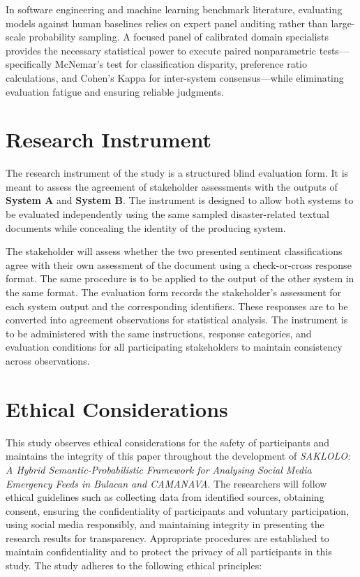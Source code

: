 \documentclass[12pt,a4paper]{report}
\newcommand{\sysA}{\textbf{System A}}
\newcommand{\sysB}{\textbf{System B}}
\begin{document}
In software engineering and machine learning benchmark literature, evaluating
models against human baselines relies on expert panel auditing rather than
large-scale probability sampling. A focused panel of calibrated domain
specialists provides the necessary statistical power to execute paired
nonparametric tests---specifically McNemar's test for classification disparity,
preference ratio calculations, and Cohen's Kappa for inter-system
consensus---while eliminating evaluation fatigue and ensuring reliable
judgments.

\section{Research Instrument}

The research instrument of the study is a structured blind evaluation form. It
is meant to assess the agreement of stakeholder assessments with the outputs of
\sysA{} and \sysB. The instrument is designed to allow both systems to be
evaluated independently using the same sampled disaster-related textual
documents while concealing the identity of the producing system.

The stakeholder will assess whether the two presented sentiment classifications
agree with their own assessment of the document using a check-or-cross response
format. The same procedure is to be applied to the output of the other system in
the same format. The evaluation form records the stakeholder's assessment for
each system output and the corresponding identifiers. These responses are to be
converted into agreement observations for statistical analysis. The instrument
is to be administered with the same instructions, response categories, and
evaluation conditions for all participating stakeholders to maintain consistency
across observations.

\section{Ethical Considerations}

This study observes ethical considerations for the safety of participants and
maintains the integrity of this paper throughout the development of
\emph{SAKLOLO: A Hybrid Semantic-Probabilistic Framework for Analysing Social
Media Emergency Feeds in Bulacan and CAMANAVA}. The researchers will follow
ethical guidelines such as collecting data from identified sources, obtaining
consent, ensuring the confidentiality of participants and voluntary
participation, using social media responsibly, and maintaining integrity in
presenting the research results for transparency. Appropriate procedures are
established to maintain confidentiality and to protect the privacy of all
participants in this study. The study adheres to the following ethical
principles:
\end{document}
